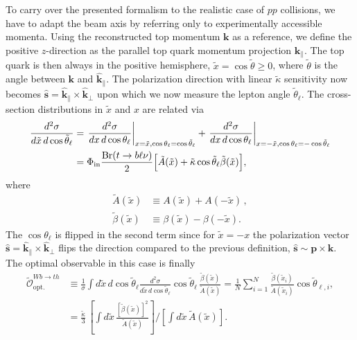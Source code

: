 \documentclass[11pt,a4paper]{article}
\newcommand{\mc}[1]{\mathcal{#1}}
\newcommand{\hvec}[1]{\bm{\hat #1}}
\begin{document}
To carry over the presented formalism to the realistic case of $pp$
collisions, we have to adapt the beam axis by referring only to
experimentally accessible momenta. Using the reconstructed top
momentum $\bm{k}$ as a reference, we define the positive $z$-direction
as the parallel top quark momentum projection $\hvec{k}_{\parallel}$. The top quark is then always in the positive
hemisphere, $\tilde x = \cos\tilde\theta \geq 0$, where $\tilde\theta$
is the angle between $\bm{k}$ and $\hvec{k}_\parallel$. The polarization direction with linear $\tilde \kappa$ sensitivity now becomes $\hvec{s} = \hvec{k}_\parallel \times \hvec{k}_\perp$ upon which we now measure the lepton angle $\tilde\theta_\ell$. The cross-section distributions in $\tilde x$ and $x$ are related via
\begin{equation}
\label{eq:d2sigmaTilde}
\begin{split}   
\frac{d^2\sigma}{d\tilde x\,d\cos \tilde\theta_\ell} &= \left.\frac{d^2\sigma}{dx\,d\cos \theta_\ell}\right|_{x=\tilde x,\cos \theta_\ell = \cos \tilde\theta_\ell} + \left.\frac{d^2\sigma}{dx\,d\cos \theta_\ell}\right|_{x=-\tilde x,\cos \theta_\ell = -\cos \tilde\theta_\ell}\\
&= \Phi_{\rm in} \frac{\mathrm{Br}(t\to b \ell \nu)}{2}\Big[\tilde A(\tilde x)  + \tilde \kappa \cos\tilde\theta_\ell \tilde \beta(\tilde x) \Big],
\end{split}
\end{equation}
where
\begin{equation}
\begin{split}       
\tilde A(\tilde x) &\equiv A(\tilde x) + A(-\tilde x)\,,\\
\tilde \beta(\tilde x) &\equiv  \beta(\tilde x) - \beta(-\tilde x).
\end{split}
\end{equation}  
The $\cos\theta_\ell$ is flipped in the second term since for 
$\tilde x = -x$ the polarization vector $\hvec{s} = \hvec{k}_\parallel \times \hvec{k}_\perp$ flips the direction compared to the previous definition, $\hvec{s} \sim \bm{p} \times \bm{k}$. The optimal observable in this case
is finally
\begin{equation}
\label{eq:OptPartonTilde}
\begin{split}      
\tilde{\mc{O}}^{Wb \to th}_\mathrm{opt.} &\equiv \frac{1}{\sigma}\int d\tilde x\,d\cos\tilde\theta_\ell   \frac{d^2\sigma}{d \tilde x\,d\cos \tilde\theta_\ell} \cos\tilde\theta_\ell\, \frac{\tilde{\beta}(\tilde x)}{\tilde{A}(\tilde{x})} = \frac{1}{N}\sum_{i=1}^N\frac{\tilde \beta(\tilde x_i)}{\tilde A(\tilde x_i)} \cos\tilde\theta_{\ell,i},\\
&=\frac{\tilde \kappa}{3}\,\left[\int d\tilde x\, \frac{[\tilde \beta(\tilde x)]^2}{\tilde{A}(\tilde{x})}\right]\Big/\left[\int d \tilde x \,\tilde A(\tilde x) \right].
\end{split}
\end{equation}
\end{document}
